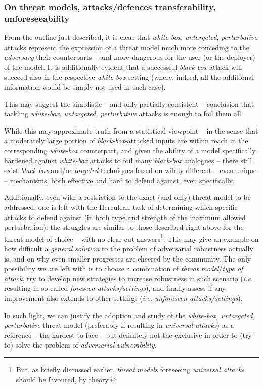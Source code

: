 \subsubsection{On threat models, attacks/defences transferability, unforeseeability}
From the outline just described, it is clear that \textit{white-box}, \textit{untargeted}, \textit{perturbative} attacks represent the expression of a threat model much more conceding to the \textit{adversary} \wrt their counterparts -- and more dangerous for the user (or the deployer) of the model.
It is additionally evident that a successful \textit{black-box} attack will succeed also in the respective \textit{white-box} setting (where, indeed, all the additional information would be simply not used in such case).

This may suggest the simplistic -- and only partially consistent -- conclusion that tackling \textit{white-box, untargeted, perturbative} attacks is enough to foil them all.

While this may approximate truth from a statistical viewpoint -- in the sense that a moderately large portion of \textit{black-box}-attacked inputs are within reach in the corresponding \textit{white-box} counterpart, and given the ability of a model specifically hardened against \textit{white-box} attacks to foil many \textit{black-box} analogues -- there still exist \textit{black-box} and/or \textit{targeted} techniques based on wildly different -- even unique -- mechanisms, both effective and hard to defend against, even specifically.

Additionally, even with a restriction to the exact (and only) threat model to be addressed, one is left with the Herculean task of determining which specific attacks to defend against (in both type and strength of the maximum allowed perturbation): the struggles are similar to those described right above for the threat model of choice -- with no clear-cut answers\footnote{But, as briefly discussed earlier, \textit{threat models} foreseeing \textit{universal attacks} should be favoured, by theory.}. This may give an example on how difficult a \textit{general solution} to the problem of adversarial robustness actually is, and on why even smaller progresses are cheered by the community.  The only possibility we are left with is to choose a combination of \textit{threat model}/\textit{type of attack}, try to develop new strategies to increase robustness in such scenario (\textit{i.e.} resulting in so-called \textit{foreseen attacks/settings}), and finally assess if any improvement also extends to other settings (\textit{i.e.} \textit{unforeseen attacks/settings}).

In such light, we can justify the adoption and study of the \textit{white-box, untargeted, perturbative} threat model (preferably if resulting in \textit{universal attacks}) as a reference -- the hardest to face -- but definitely not the exclusive in order to (try to) solve the problem of \textit{adversarial vulnerability}.
